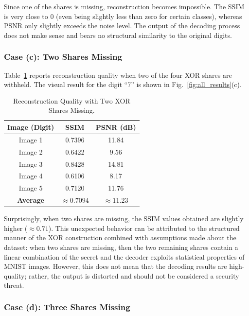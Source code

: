 Since one of the shares is missing, reconstruction becomes impossible. The SSIM is very close to
0 (even being slightly less than zero for certain classes), whereas PSNR only slightly
exceeds the noise level. The output of the decoding process does not make sense and bears no structural similarity to the original digits.

\subsubsection{Case (c): Two Shares Missing}

Table~\ref{tab:xor_miss2} reports reconstruction quality when two of the four
XOR shares are withheld. The visual result for the digit ``7'' is shown in
Fig.~\ref{fig:all_results}(c).

\begin{table}[htbp]
\centering
\caption{Reconstruction Quality with Two XOR Shares Missing.}
\label{tab:xor_miss2}
\begin{tabular}{|c|c|c|}
\hline
\textbf{Image (Digit)} & \textbf{SSIM} & \textbf{PSNR (dB)} \\
\hline
Image 1   & 0.7396 & 11.84 \\
Image 2   & 0.6422 &  9.56 \\
Image 3   & 0.8428 & 14.81 \\
Image 4   & 0.6106 &  8.17 \\
Image 5   & 0.7120 & 11.76 \\
\hline
\textbf{Average} & $\mathbf{\approx 0.7094}$ & $\mathbf{\approx 11.23}$ \\
\hline
\end{tabular}
\end{table}

Surprisingly, when two shares are missing, the SSIM values obtained
are slightly higher ($\approx 0.71$). This unexpected behavior can be attributed
to the structured manner of the XOR construction combined with assumptions made
about the dataset: when two shares are missing, then the two remaining shares
contain a linear combination of the secret and the decoder exploits statistical
properties of MNIST images. However, this does not mean that the decoding
results are high-quality; rather, the output is distorted and should not
be considered a security threat.

\subsubsection{Case (d): Three Shares Missing}

